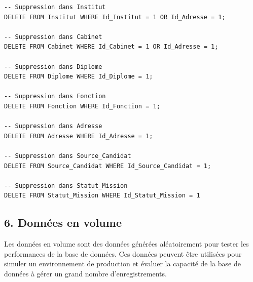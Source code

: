 \documentclass[a4paper,12pt]{article}
\begin{document}
\begin{verbatim}
-- Suppression dans Institut
DELETE FROM Institut WHERE Id_Institut = 1 OR Id_Adresse = 1;

-- Suppression dans Cabinet
DELETE FROM Cabinet WHERE Id_Cabinet = 1 OR Id_Adresse = 1;

-- Suppression dans Diplome
DELETE FROM Diplome WHERE Id_Diplome = 1;

-- Suppression dans Fonction
DELETE FROM Fonction WHERE Id_Fonction = 1;

-- Suppression dans Adresse
DELETE FROM Adresse WHERE Id_Adresse = 1;

-- Suppression dans Source_Candidat
DELETE FROM Source_Candidat WHERE Id_Source_Candidat = 1;

-- Suppression dans Statut_Mission
DELETE FROM Statut_Mission WHERE Id_Statut_Mission = 1

\end{verbatim}
\subsection*{6. Données en volume}

Les données en volume sont des données générées aléatoirement pour tester les performances de la base de données. Ces données peuvent être utilisées pour simuler un environnement de production et évaluer la capacité de la base de données à gérer un grand nombre d'enregistrements.
\end{document}
